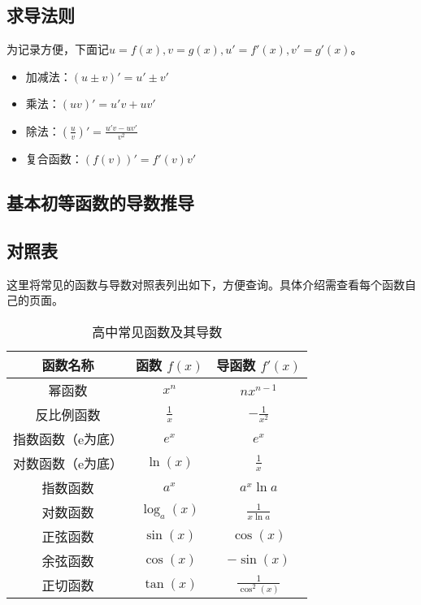 \subsection{求导法则}

为记录方便，下面记$u=f(x),v=g(x),u'=f'(x),v'=g'(x)$。

\begin{itemize}
\item 加减法：$(u\pm v)'=u'\pm v'$
\item 乘法：$(uv)'=u'v+uv'$
\item 除法：$\displaystyle\left(\frac{u}{v}\right)'=\frac{u'v-uv'}{v^2}$
\item 复合函数：$(f(v))'=f'(v)v'$
\end{itemize}

\subsection{基本初等函数的导数推导}

\subsection{对照表}

这里将常见的函数与导数对照表列出如下，方便查询。具体介绍需查看每个函数自己的页面。

\begin{table}[ht]
\centering
\caption{高中常见函数及其导数}\label{tab_HsDerv1}
\begin{tabular}{|c|c|c|}
\hline
\textbf{函数名称}     & \textbf{函数 $f(x)$}     & \textbf{导函数 $f'(x)$}     \\ \hline
幂函数&$x^n$                    & $n x^{n-1}$                \\ \hline
反比例函数&$\displaystyle\frac{1}{x}$             & $\displaystyle-\frac{1}{x^2}$           \\ \hline
指数函数（e为底）&$e^x$                     & $e^x$                      \\ \hline
对数函数（e为底）&$\ln(x)$                  & $\displaystyle\frac{1}{x}$              \\ \hline
指数函数&$a^x$                     & $a^x\ln a $                      \\ \hline
对数函数&$\log_a(x)$                  & $\displaystyle \frac{1}{x\ln a}$              \\ \hline
正弦函数&$\sin(x)$                 & $\cos(x)$                  \\ \hline
余弦函数&$\cos(x)$                 & $-\sin(x)$                 \\ \hline
正切函数&$\tan(x)$                 & $\displaystyle \frac{1}{\cos^2(x)}$                \\ \hline
\end{tabular}
\end{table}


